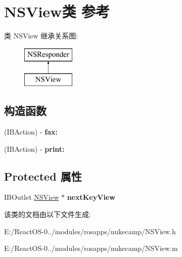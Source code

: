 \hypertarget{interface_n_s_view}{}\section{N\+S\+View类 参考}
\label{interface_n_s_view}
类 N\+S\+View 继承关系图\+:\begin{figure}[H]
\begin{center}
\leavevmode
\includegraphics[height=2.000000cm]{interface_n_s_view}
\end{center}
\end{figure}
\subsection*{构造函数}
\begin{DoxyCompactItemize}
\item 
\mbox{\label{interface_n_s_view_ad1e29e38fe496d99f6f9275b6ce01f40}} 
(I\+B\+Action) -\/ {\bfseries fax\+:}
\item 
\mbox{\label{interface_n_s_view_ac69ad286b52602069d6ebdf7e99184ad}} 
(I\+B\+Action) -\/ {\bfseries print\+:}
\end{DoxyCompactItemize}
\subsection*{Protected 属性}
\begin{DoxyCompactItemize}
\item 
\mbox{\label{interface_n_s_view_a99df8b31e499ab6f57f6f7b68226d9c0}} 
I\+B\+Outlet \hyperlink{interface_n_s_view}{N\+S\+View} $\ast$ {\bfseries next\+Key\+View}
\end{DoxyCompactItemize}


该类的文档由以下文件生成\+:\begin{DoxyCompactItemize}
\item 
E\+:/\+React\+O\+S-\/0../modules/rosapps/nukecamp/N\+S\+View.\+h\item 
E\+:/\+React\+O\+S-\/0../modules/rosapps/nukecamp/N\+S\+View.\+m\end{DoxyCompactItemize}
